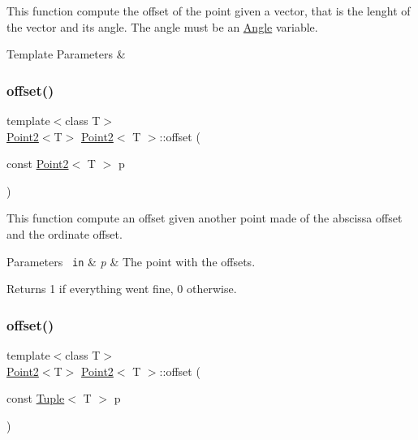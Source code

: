 This function compute the offset of the point given a vector, that is the lenght of the vector and its angle. The angle must be an {\ttfamily \mbox{\hyperlink{class_angle}{Angle}}} variable. 


\begin{DoxyTemplParams}{Template Parameters}
{\em } & \\
\hline
\end{DoxyTemplParams}
\mbox{\label{class_point2_a45882a15db20f34b2d062d7f11a135cd}} 
\subsubsection{\texorpdfstring{offset()}{offset()}\hspace{0.1cm}{\footnotesize\ttfamily [2/3]}}
{\footnotesize\ttfamily template$<$class T$>$ \\
\mbox{\hyperlink{class_point2}{Point2}}$<$T$>$ \mbox{\hyperlink{class_point2}{Point2}}$<$ T $>$\+::offset (\begin{DoxyParamCaption}\item[{const \mbox{\hyperlink{class_point2}{Point2}}$<$ T $>$}]{p }\end{DoxyParamCaption})\hspace{0.3cm}{\ttfamily [inline]}}



This function compute an offset given another point made of the abscissa offset and the ordinate offset. 


\begin{DoxyParams}[1]{Parameters}
\mbox{\texttt{ in}}  & {\em p} & The point with the offsets. \\
\hline
\end{DoxyParams}
\begin{DoxyReturn}{Returns}
1 if everything went fine, 0 otherwise. 
\end{DoxyReturn}
\mbox{\label{class_point2_afaa5aa2f9bff328766572129db789059}} 
\subsubsection{\texorpdfstring{offset()}{offset()}\hspace{0.1cm}{\footnotesize\ttfamily [3/3]}}
{\footnotesize\ttfamily template$<$class T$>$ \\
\mbox{\hyperlink{class_point2}{Point2}}$<$T$>$ \mbox{\hyperlink{class_point2}{Point2}}$<$ T $>$\+::offset (\begin{DoxyParamCaption}\item[{const \mbox{\hyperlink{class_tuple}{Tuple}}$<$ T $>$}]{p }\end{DoxyParamCaption})\hspace{0.3cm}{\ttfamily [inline]}}



